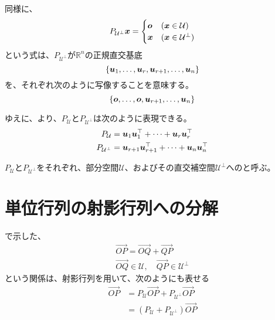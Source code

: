 \documentclass[../../../topic_linear-algebra]{subfiles}
\begin{document}
\br

同様に、
\begin{equation*}
  P_{\mathcal{U}^{\perp}}\vb*{x} = \begin{cases}
    \vb*{o} & (\vb*{x} \in \mathcal{U})         \\
    \vb*{x} & (\vb*{x} \in \mathcal{U}^{\perp})
  \end{cases}
\end{equation*}
という式は、$P_{\mathcal{U}^{\perp}}$が$\mathbb{R}^n$の正規直交基底
\begin{equation*}
  \{ \vb*{u}_1, \ldots, \vb*{u}_r, \vb*{u}_{r+1}, \ldots, \vb*{u}_n \}
\end{equation*}
を、それぞれ次のように写像することを意味する。
\begin{equation*}
  \{ \vb*{o}, \ldots, \vb*{o}, \vb*{u}_{r+1}, \ldots, \vb*{u}_n \}
\end{equation*}

\br

ゆえに、より、$P_{\mathcal{U}}$と$P_{\mathcal{U}^{\perp}}$は次のように表現できる。
\begin{align*}
  P_{\mathcal{U}}         & = \vb*{u}_1 \vb*{u}_1^\top + \cdots + \vb*{u}_r \vb*{u}_r^\top         \\
  P_{\mathcal{U}^{\perp}} & = \vb*{u}_{r+1} \vb*{u}_{r+1}^\top + \cdots + \vb*{u}_n \vb*{u}_n^\top
\end{align*}

$P_{\mathcal{U}}$と$P_{\mathcal{U}^{\perp}}$をそれぞれ、部分空間$\mathcal{U}$、およびその直交補空間$\mathcal{U}^{\perp}$へのと呼ぶ。

\sectionline
\section{単位行列の射影行列への分解}\label{sec:identity-to-projections}

で示した、
\begin{gather*}
  \overrightarrow{OP} = \overrightarrow{OQ} + \overrightarrow{QP} \\
  \overrightarrow{OQ} \in \mathcal{U}, \quad \overrightarrow{QP} \in \mathcal{U}^\perp
\end{gather*}
という関係は、射影行列を用いて、次のようにも表せる
\begin{align*}
  \overrightarrow{OP} & = P_{\mathcal{U}}\overrightarrow{OP} + P_{\mathcal{U}^{\perp}}\overrightarrow{OP} \\
                      & = (P_{\mathcal{U}} + P_{\mathcal{U}^{\perp}})\overrightarrow{OP}
\end{align*}
\end{document}
